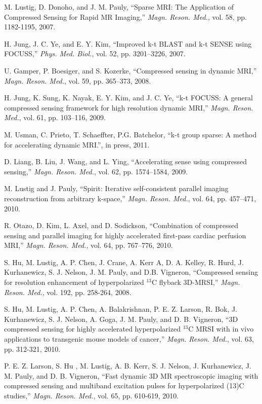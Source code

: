 \documentclass[10pt,draftcls, onecolumn]{IEEEtran}
\begin{document}
\begin{thebibliography}{}
M. Lustig,  D. Donoho, and J. M. Pauly, ``Sparse MRI: The Application of Compressed Sensing for Rapid MR Imaging,'' \emph{Magn. Reson. Med.}, vol. 58, pp. 1182-1195, 2007.

H. Jung, J. C. Ye, and E. Y. Kim, ``Improved k-t BLAST and k-t SENSE using FOCUSS,'' \emph{Phys. Med. Biol.}, vol. 52, pp. 3201–3226, 2007.

U. Gamper, P. Boesiger, and S. Kozerke, ``Compressed sensing in dynamic MRI,'' \emph{Magn. Reson. Med.}, vol. 59, pp. 365–373, 2008.

H. Jung, K. Sung, K. Nayak, E. Y. Kim, and J. C. Ye, ``k-t FOCUSS: A general compressed sensing framework for high resolution dynamic MRI,'' \emph{Magn. Reson. Med.}, vol. 61, pp. 103–116, 2009.

M. Usman, C. Prieto, T. Schaeffter, P.G. Batchelor, ``k-t group sparse: A method for accelerating dynamic MRI.'', in press, 2011.

D. Liang, B. Liu, J. Wang, and L. Ying, ``Accelerating sense using compressed sensing,'' \emph{Magn. Reson. Med.}, vol. 62, pp. 1574–1584, 2009.

M. Lustig and J. Pauly, ``Spirit: Iterative self-consistent parallel imaging reconstruction from arbitrary k-space,'' \emph{Magn. Reson. Med.}, vol. 64, pp. 457–471, 2010.

R. Otazo, D. Kim, L. Axel, and D. Sodickson, ``Combination of compressed sensing and parallel imaging for highly accelerated first-pass cardiac perfusion MRI,'' \emph{Magn. Reson. Med.}, vol. 64, pp. 767–776, 2010.

S. Hu, M. Lustig, A. P. Chen, J. Crane, A. Kerr A, D. A. Kelley, R. Hurd, J. Kurhanewicz, S. J. Nelson, J. M. Pauly, and D.B. Vigneron, ``Compressed sensing for resolution enhancement of hyperpolarized $^{13}$C flyback 3D-MRSI,'' \emph{Magn. Reson. Med.}, vol. 192, pp. 258-264, 2008.

S. Hu, M. Lustig, A. P. Chen, A. Balakrishnan, P. E. Z. Larson, R. Bok, J. Kurhanewicz, S. J. Nelson, A. Goga, J. M. Pauly, and D. B. Vigneron, ``3D compressed sensing for highly accelerated hyperpolarized $^{13}$C MRSI with in vivo applications to transgenic mouse models of cancer,'' \emph{Magn. Reson. Med.}, vol. 63, pp. 312-321, 2010.

P. E. Z. Larson, S. Hu , M. Lustig, A. B. Kerr, S. J. Nelson, J. Kurhanewicz, J. M. Pauly, and D. B. Vigneron, ``Fast dynamic 3D MR spectroscopic imaging with compressed sensing and multiband excitation pulses for hyperpolarized (13)C studies,'' \emph{Magn. Reson. Med.}, vol. 65, pp. 610-619, 2010.


\end{thebibliography}
\end{document}
